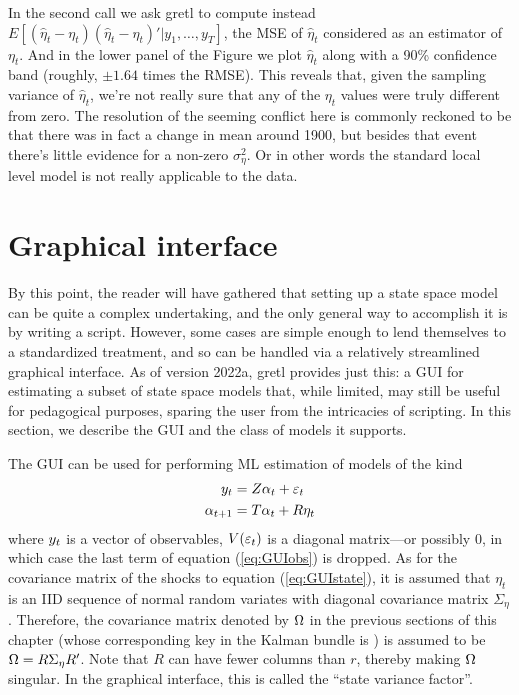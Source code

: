 In the second  call we ask gretl to compute instead
$E[(\hat{\eta}_t-\eta_t)(\hat{\eta}_t-\eta_t)' | y_1,\ldots,y_T]$, the
MSE of $\hat{\eta}_t$ considered as an estimator of $\eta_t$. And in
the lower panel of the Figure we plot $\hat{\eta}_t$ along with a 90\%
confidence band (roughly, $\pm 1.64$ times the RMSE). This reveals
that, given the sampling variance of $\hat{\eta}_t$, we're not really
sure that any of the $\eta_t$ values were truly different from
zero. The resolution of the seeming conflict here is commonly reckoned
to be that there was in fact a change in mean around 1900, but besides
that event there's little evidence for a non-zero
$\sigma^2_{\eta}$. Or in other words the standard local level model is
not really applicable to the data.

\section{Graphical interface}
\label{sec:kalman-gui}
\newcommand{\steta}{\eta}
\newcommand{\strR}{R}

By this point, the reader will have gathered that setting up a state
space model can be quite a complex undertaking, and the only general
way to accomplish it is by writing a script.  However, some cases are
simple enough to lend themselves to a standardized treatment, and so
can be handled via a relatively streamlined graphical interface.  As
of version 2022a, gretl provides just this: a GUI for estimating a
subset of state space models that, while limited, may still be useful
for pedagogical purposes, sparing the user from the intricacies of
scripting.  In this section, we describe the GUI and the class of
models it supports.

The GUI can be used for performing ML estimation of models of the kind
\begin{align}
  \label{eq:GUIobs}
  \obsvec_t & = \obsymat \statevec_{t} + \obsdist_t \\
  \label{eq:GUIstate}
  \statevec_{t+1} & = \statemat \statevec_t + \strR \steta_t
\end{align}
where $y_t$ is a vector of observables, $V(\varepsilon_t)$ is a
diagonal matrix---or possibly 0, in which case the last term of
equation (\ref{eq:GUIobs}) is dropped. As for the covariance matrix of
the shocks to equation (\ref{eq:GUIstate}), it is assumed that
$\steta_t$ is an IID sequence of normal random variates with diagonal
covariance matrix $\Sigma_\steta$. Therefore, the covariance matrix
denoted by $\Omega$ in the previous sections of this chapter (whose
corresponding key in the Kalman bundle is ) is assumed
to be $\statevar = R \Sigma_\steta R'$. Note that $\strR$ can have
fewer columns than $r$, thereby making $\Omega$ singular. In the
graphical interface, this is called the ``state variance factor''.


